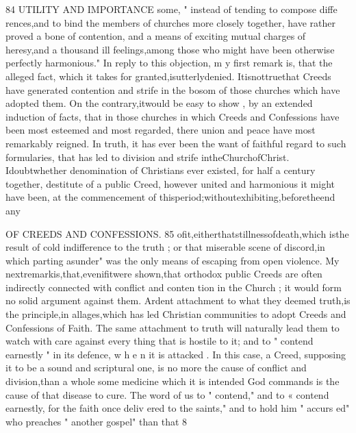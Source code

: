 \documentclass[
]{book}
\begin{document}
84 UTILITY AND IMPORTANCE
some, " instead of tending to compose diffe rences,and to bind the members of churches
more closely together, have rather proved a bone of contention, and a means of exciting
mutual charges of heresy,and a thousand ill feelings,among those who might have been
otherwise perfectly harmonious."
In reply to this objection, m y first remark
is, that the alleged fact, which it takes for
granted,isutterlydenied. Itisnottruethat
Creeds have generated contention and strife
in the bosom of those churches which have
adopted them. On the contrary,itwould be easy to show , by an extended induction of
facts, that in those churches in which Creeds and Confessions have been most esteemed and
most regarded, there union and peace have most remarkably reigned. In truth, it has ever been the want of faithful regard to such formularies, that has led to division and strife intheChurchofChrist. Idoubtwhether
denomination of Christians ever existed, for
half a century together, destitute of a public Creed, however united and harmonious it
might have been, at the commencement of thisperiod;withoutexhibiting,beforetheend
any

OF CREEDS AND CONFESSIONS. 85
ofit,eitherthatstillnessofdeath,which isthe
result of cold indifference to the truth ; or that
miserable scene of discord,in which parting
asunder" was the only means of escaping from open violence.
My nextremarkis,that,evenifitwere shown,that orthodox public Creeds are often indirectly connected with conflict and conten
tion in the Church ; it would form no solid
argument against them. Ardent attachment
to what they deemed truth,is the principle,in
allages,which has led Christian communities
to adopt Creeds and Confessions of Faith.
The same attachment to truth will naturally lead them to watch with care against every
thing that is hostile to it; and to " contend earnestly " in its defence, w h e n it is attacked .
In this case, a Creed, supposing it to be a sound and scriptural one, is no
more the cause of conflict and division,than a whole
some medicine which it is intended
God commands
is the cause of that disease to cure. The word of us to " contend," and to
« contend earnestly, for the faith once deliv ered to the saints," and to hold him " accurs
ed" who preaches " another gospel" than that
8
\end{document}
